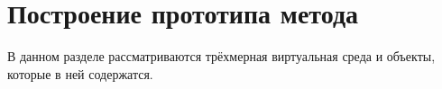 \chapter{Построение прототипа метода}
В данном разделе рассматриваются трёхмерная виртуальная среда и объекты, которые в ней содержатся.